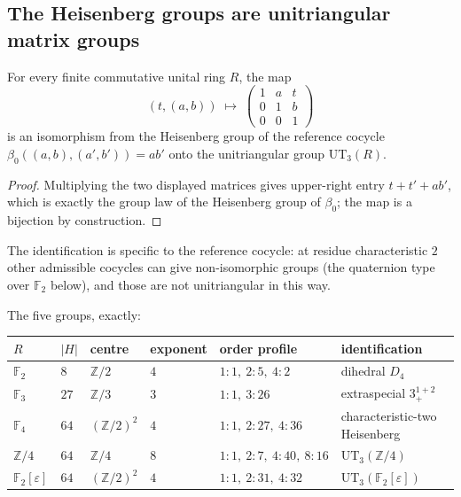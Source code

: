 
\subsection{The Heisenberg groups are unitriangular matrix groups}

\begin{proposition}
\label{prop:ut3}
For every finite commutative unital ring $R$, the map
\[
(t,(a,b))\;\longmapsto\;
\begin{pmatrix}1&a&t\\0&1&b\\0&0&1\end{pmatrix}
\]
is an isomorphism from the Heisenberg group of the reference cocycle
$\beta_0((a,b),(a',b'))=ab'$ onto the unitriangular group
$\mathrm{UT}_3(R)$.
\end{proposition}

\begin{proof}
Multiplying the two displayed matrices gives upper-right entry
$t+t'+ab'$, which is exactly the group law of the Heisenberg group of
$\beta_0$; the map is a bijection by construction.
\end{proof}

\begin{scope}
The identification is specific to the reference cocycle: at residue
characteristic $2$ other admissible cocycles can give non-isomorphic groups
(the quaternion type over $\mathbb F_2$ below), and those are not
unitriangular in this way.
\end{scope}


The five groups, exactly:

\begin{center}
\begin{tabular}{llllll}
$R$ & $|H|$ & centre & exponent & order profile & identification\\
\hline
$\mathbb F_2$ & $8$ & $\mathbb Z/2$ & $4$ & $1{:}1,\ 2{:}5,\ 4{:}2$ &
dihedral $D_4$\\
$\mathbb F_3$ & $27$ & $\mathbb Z/3$ & $3$ & $1{:}1,\ 3{:}26$ &
extraspecial $3^{1+2}_{+}$\\
$\mathbb F_4$ & $64$ & $(\mathbb Z/2)^2$ & $4$ & $1{:}1,\ 2{:}27,\ 4{:}36$ &
characteristic-two Heisenberg\\
$\mathbb Z/4$ & $64$ & $\mathbb Z/4$ & $8$ & $1{:}1,\ 2{:}7,\ 4{:}40,\ 8{:}16$ &
$\mathrm{UT}_3(\mathbb Z/4)$\\
$\mathbb F_2[\varepsilon]$ & $64$ & $(\mathbb Z/2)^2$ & $4$ &
$1{:}1,\ 2{:}31,\ 4{:}32$ & $\mathrm{UT}_3(\mathbb F_2[\varepsilon])$\\
\end{tabular}
\end{center}

